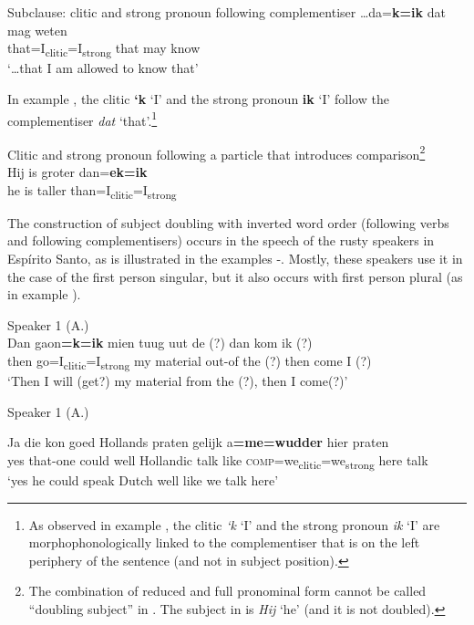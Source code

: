 \documentclass[output=paper,hidelinks,draftmode]{langscibook}
\begin{document}
\ea Subclause: clitic and strong pronoun following complementiser
\label{ex:schaffel:12}
\gll …da=\textbf{k=ik} dat mag weten\\
that=I\textsubscript{clitic}=I\textsubscript{strong} that may know\\
\glt ‘…that I am allowed to know that’

\z


In example , the clitic \textbf{‘k} ‘I’ and the strong pronoun \textbf{ik} ‘I’ follow the complementiser \textit{dat} ‘that’.\footnote{{As observed in example , the clitic} {\textit{‘k} }{‘I’ and the strong pronoun} {\textit{ik} }{‘I’ are morphophonologically linked to the complementiser that is on the left periphery of the sentence (and not in subject position).}}

\ea Clitic and strong pronoun following a particle that introduces comparison\footnote{{The combination of reduced and full pronominal form cannot be called ``doubling subject'' in . The subject in  is} {\textit{Hij} }{‘he’ (and it is not doubled).}}\\
\label{ex:schaffel:13}
Hij is groter dan=\textbf{ek=ik}\\
\glt he is taller than=I\textsubscript{clitic}=I\textsubscript{strong}

\z

The construction of subject doubling with inverted word order (following verbs and following complementisers) occurs in the speech of the rusty speakers in Espírito Santo, as is illustrated in the examples -. Mostly, these speakers use it in the case of the first person singular, but it also occurs with first person plural (as in example ).

\ea Speaker 1 (A.)\\
\label{ex:schaffel:14}
\gll Dan gaon\textbf{=k=ik} mien tuug uut {de (?)} dan kom {ik (?)}\\
then go=I\textsubscript{clitic}=I\textsubscript{strong} my material out-of {the (?)} then come {I (?)} \\
\glt ‘Then I will (get?) my material from the (?), then I come(?)’

\z



\ea Speaker 1 (A.)
\label{ex:schaffel:15}

\gll Ja die kon goed Hollands praten gelijk a\textbf{=me=wudder} hier praten\\
yes that-one could well Hollandic talk like \textsc{comp}=we\textsubscript{clitic}=we\textsubscript{strong} here talk\\
\glt ‘yes he could speak Dutch well like we talk here’
\end{document}
